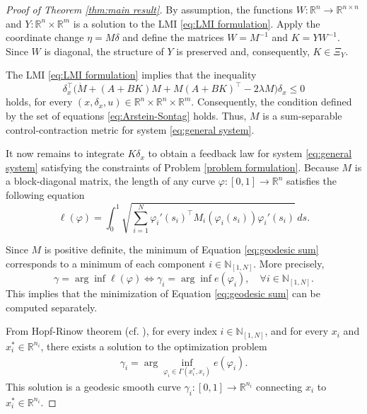 \documentclass[10pt,twocolumn,twoside]{IEEEtran}
\theoremstyle{plain}
\theoremstyle{definition}
\theoremstyle{remark}
\begin{document}
\begin{proof}[Proof of Theorem \ref{thm:main result}]
	By assumption, the functions $W:\mathbb{R}^n\to\mathbb{R}^{n\times n}$ and $Y:\mathbb{R}^n\times\mathbb{R}^m$ is a solution to the LMI \eqref{eq:LMI formulation}. Apply the coordinate change $\eta=M\delta$ and define the matrices $W=M^{-1}$ and $K=YW^{-1}$. Since $W$ is diagonal, the structure of $Y$ is preserved and, consequently, $K\in\Xi_Y$.
	
	The LMI \eqref{eq:LMI formulation} implies that the inequality
	\begin{equation*}
		\delta_x^\top\bigg(\dot{M}+(A+BK)M+M(A+BK)^\top-2\lambda M\bigg)\delta_x\leq0
	\end{equation*}
	holds, for every $(x,\delta_x,u)\in\mathbb{R}^n\times\mathbb{R}^n\times\mathbb{R}^m$. Consequently, the condition defined by the set of equations \eqref{eq:Arstein-Sontag} holds. Thus, $M$ is a sum-separable control-contraction metric for system \eqref{eq:general system}.
	
	It now remains to integrate $K\delta_x$ to obtain a feedback law for system \eqref{eq:general system} satisfying the constraints of Problem \ref{problem formulation}. Because $M$ is a block-diagonal matrix, the length of any curve $\varphi:[0,1]\to\mathbb{R}^n$ satisfies the following equation
	\begin{equation}\label{eq:geodesic sum}
		\ell(\varphi)=\int_0^1\sqrt{\sum_{i=1}^N \varphi_i'(s_i)^\top M_i(\varphi_i(s_i))\varphi_i'(s_i)}\,ds.
	\end{equation}

	
	Since $M$ is positive definite, the minimum of Equation \eqref{eq:geodesic sum} corresponds to a minimum of each component $i\in\mathbb{N}_{[1,N]}$. More precisely, 
	\begin{equation*}
		\gamma=\arg\inf\ell(\varphi)\Leftrightarrow\gamma_i=\arg\inf e(\varphi_i),\quad\forall i\in\mathbb{N}_{[1,N]}.
	\end{equation*}
	This implies that the minimization of Equation \eqref{eq:geodesic sum} can be computed separately. 
	
	From Hopf-Rinow theorem (cf. \cite[Theorem 7.7]{Boothby1986}), for every index $i\in\mathbb{N}_{[1,N]}$, and for every $x_i$ and $x_i^\ast\in\mathbb{R}^{n_i}$, there exists a solution to the optimization problem
	\begin{align*}
		\gamma_i=\arg\inf_{\varphi_i\in\Gamma(x_i^\ast,x_i)} e(\varphi_i).
	\end{align*}
	This solution is a geodesic smooth curve $\gamma_i:[0,1]\to\mathbb{R}^{n_i}$ connecting $x_i$ to $x_i^\ast\in\mathbb{R}^{n_i}$. 
	

\end{proof}
\end{document}
